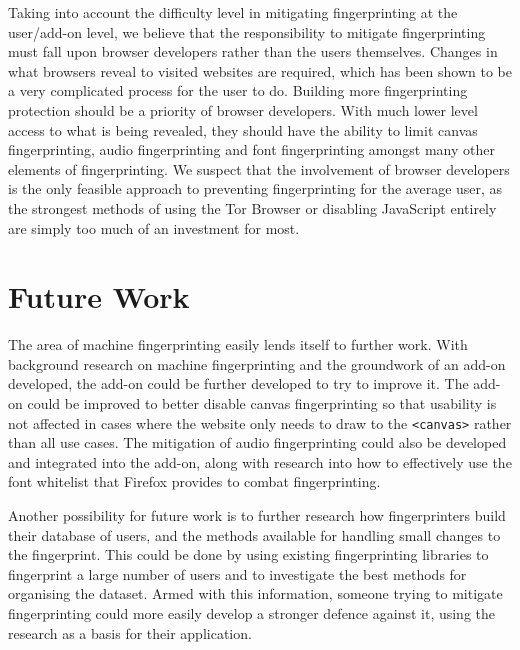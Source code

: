 Taking into account the difficulty level in mitigating fingerprinting at the user/add-on level, we believe that the responsibility to mitigate fingerprinting must fall upon browser developers rather than the users themselves.
Changes in what browsers reveal to visited websites are required, which has been shown to be a very complicated process for the user to do.
Building more fingerprinting protection should be a priority of browser developers.
With much lower level access to what is being revealed, they should have the ability to limit canvas fingerprinting, audio fingerprinting and font fingerprinting amongst many other elements of fingerprinting.
We suspect that the involvement of browser developers is the only feasible approach to preventing fingerprinting for the average user, as the strongest methods of using the Tor Browser or disabling JavaScript entirely are simply too much of an investment for most.

\section{Future Work}

The area of machine fingerprinting easily lends itself to further work.
With background research on machine fingerprinting and the groundwork of an add-on developed, the add-on could be further developed to try to improve it.
The add-on could be improved to better disable canvas fingerprinting so that usability is not affected in cases where the website only needs to draw to the \texttt{<canvas>} rather than all use cases.
The mitigation of audio fingerprinting could also be developed and integrated into the add-on, along with research into how to effectively use the font whitelist that Firefox provides to combat fingerprinting.

Another possibility for future work is to further research how fingerprinters build their database of users, and the methods available for handling small changes to the fingerprint.
This could be done by using existing fingerprinting libraries to fingerprint a large number of users and to investigate the best methods for organising the dataset.
Armed with this information, someone trying to mitigate fingerprinting could more easily develop a stronger defence against it, using the research as a basis for their application.

